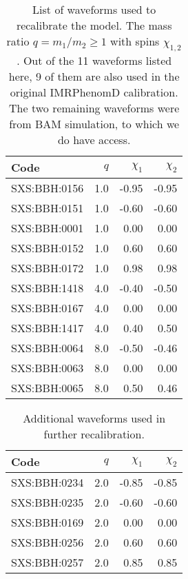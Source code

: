 \documentclass[twocolumn]{aastex631}
\begin{document}
\begin{table}[t]
	\begin{tabularx}{0.8\columnwidth}{@{\extracolsep{\fill}}lrrr}
		\toprule\midrule
		Code         & $q$ & $\chi_1$ & $\chi_2$ \\ \midrule\midrule
		SXS:BBH:0156 & 1.0 & -0.95    & -0.95    \\
		SXS:BBH:0151 & 1.0 & -0.60    & -0.60    \\
		SXS:BBH:0001 & 1.0 &  0.00    &  0.00    \\
		SXS:BBH:0152 & 1.0 &  0.60    &  0.60    \\
		SXS:BBH:0172 & 1.0 &  0.98    &  0.98    \\
		SXS:BBH:1418 & 4.0 & -0.40    & -0.50    \\
		SXS:BBH:0167 & 4.0 &  0.00    &  0.00    \\
		SXS:BBH:1417 & 4.0 &  0.40    &  0.50    \\
		SXS:BBH:0064 & 8.0 & -0.50    & -0.46    \\
		SXS:BBH:0063 & 8.0 &  0.00    &  0.00    \\
		SXS:BBH:0065 & 8.0 &  0.50    &  0.46    \\ \midrule\bottomrule
	\end{tabularx}
	\caption{List of waveforms used to recalibrate the model. The mass ratio $q=m_1/m_2\geq 1$ with spins $\chi_{1,2}$. Out of the 11 waveforms listed here, 9 of them are also used in the original IMRPhenomD calibration. \cite{khan2016frequency} The two remaining waveforms were from BAM simulation, to which we do have access.}
	\label{tab:q148}
\end{table}
\begin{table}[t]
	\begin{tabularx}{0.8\columnwidth}{@{\extracolsep{\fill}}lrrr}
		\toprule\midrule
		Code         & $q$ & $\chi_1$ & $\chi_2$ \\ \midrule\midrule
		SXS:BBH:0234 & 2.0 & -0.85    & -0.85    \\
		SXS:BBH:0235 & 2.0 & -0.60    & -0.60    \\
		SXS:BBH:0169 & 2.0 & 0.00     & 0.00     \\
		SXS:BBH:0256 & 2.0 & 0.60     & 0.60     \\
		SXS:BBH:0257 & 2.0 & 0.85     & 0.85     \\ \midrule\bottomrule
	\end{tabularx}
	\caption{Additional waveforms used in further recalibration.}
	\label{tab:q1248}
\end{table}
\end{document}
